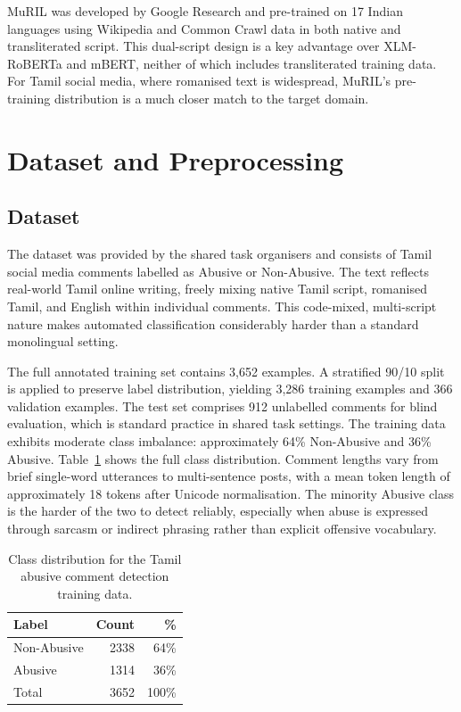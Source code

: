 \documentclass[11pt]{article}
\begin{document}
MuRIL \cite{khanuja2021} was developed by Google Research
and pre-trained on 17 Indian languages using
Wikipedia and Common Crawl data in both native
and transliterated script. This dual-script design is
a key advantage over XLM-RoBERTa and mBERT,
neither of which includes transliterated training
data. For Tamil social media, where romanised text
is widespread, MuRIL's pre-training distribution is
a much closer match to the target domain.

\section{Dataset and Preprocessing}

\subsection{Dataset}

The dataset was provided by the shared task organisers and consists of Tamil social media comments labelled as Abusive or Non-Abusive. The
text reflects real-world Tamil online writing, freely
mixing native Tamil script, romanised Tamil, and
English within individual comments. This code-mixed, multi-script nature makes automated classification considerably harder than a standard monolingual setting.

The full annotated training set contains 3,652
examples. A stratified 90/10 split is applied to
preserve label distribution, yielding 3,286 training
examples and 366 validation examples. The test set
comprises 912 unlabelled comments for blind evaluation, which is standard practice in shared task
settings. The training data exhibits moderate class
imbalance: approximately 64\% Non-Abusive and
36\% Abusive. Table~\ref{tab:dist} shows the full class distribution. Comment lengths vary from brief single-word
utterances to multi-sentence posts, with a mean token length of approximately 18 tokens after Unicode normalisation. The minority Abusive class
is the harder of the two to detect reliably, especially when abuse is expressed through sarcasm
or indirect phrasing rather than explicit offensive
vocabulary.

\begin{table}[h]
\centering
\begin{tabular}{lrr}
\toprule
\textbf{Label} & \textbf{Count} & \textbf{\%} \\
\midrule
Non-Abusive & 2338 & 64\% \\
Abusive     & 1314 & 36\% \\
\midrule
Total       & 3652 & 100\% \\
\bottomrule
\end{tabular}
\caption{Class distribution for the Tamil abusive comment detection training data.}
\label{tab:dist}
\end{table}
\end{document}
